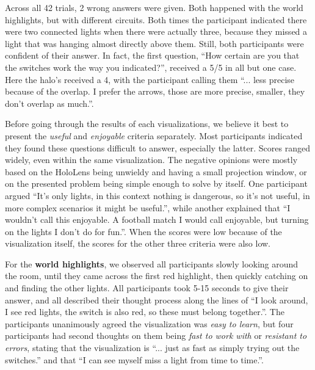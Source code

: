 Across all 42 trials, 2 wrong answers were given. Both happened with the world highlights, but with different circuits. Both times the participant indicated there were two connected lights when there were actually three, because they missed a light that was hanging almost directly above them. Still, both participants were confident of their answer. In fact, the first question, ``How certain are you that the switches work the way you indicated?'', received a 5/5 in all but one case. Here the halo's received a 4, with the participant calling them ``... less precise because of the overlap. I prefer the arrows, those are more precise, smaller, they don't overlap as much.''.

Before going through the results of each visualizations, we believe it best to present the \textit{useful} and \textit{enjoyable} criteria separately. Most participants indicated they found these questions difficult to answer, especially the latter. Scores ranged widely, even within the same visualization. The negative opinions were mostly based on the HoloLens being unwieldy and having a small projection window, or on the presented problem being simple enough to solve by itself. One participant argued ``It's only lights, in this context nothing is dangerous, so it's not useful, in more complex scenarios it might be useful.'', while another explained that ``I wouldn't call this enjoyable. A football match I would call enjoyable, but turning on the lights I don't do for fun.''. When the scores were low because of the visualization itself, the scores for the other three criteria were also low.

For the \textbf{world highlights}, we observed all participants slowly looking around the room, until they came across the first red highlight, then quickly catching on and finding the other lights. All participants took 5-15 seconds to give their answer, and all described their thought process along the lines of ``I look around, I see red lights, the switch is also red, so these must belong together.''. The participants unanimously agreed the visualization was \textit{easy to learn}, but four participants had second thoughts on them being \textit{fast to work with} or \textit{resistant to errors}, stating that the visualization is ``... just as fast as simply trying out the switches.'' and that ``I can see myself miss a light from time to time.''.

